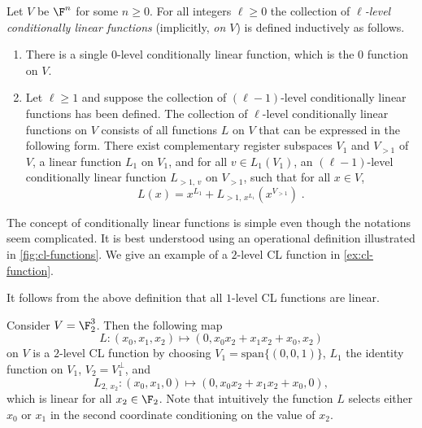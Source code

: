\begin{definition}
  \label{def:cl-func}
	Let $V$ be $\F^n$ for some $n\geq 0$.
  For all integers $\ell\geq 0$ the collection of \emph{$\ell$-level
    conditionally linear functions} (implicitly, \emph{on $V$}) is defined
  inductively as follows.
  \begin{enumerate}
  \item There is a single $0$-level conditionally linear function, which is the
    $0$ function on $V$.

  \item Let $\ell \geq 1$ and suppose the collection of $(\ell-1)$-level
    conditionally linear functions has been defined.
    The collection of $\ell$-level conditionally linear functions on $V$ consists
    of all functions $L$ on $V$ that can be expressed in the following form.
    There exist complementary register subspaces $V_1$ and $V_{>1}$ of $V$, a
    linear function $L_1$ on $V_1$, and for all $v \in L_1(V_1)$, an
    $(\ell-1)$-level conditionally linear function $L_{>1,\, v}$ on $V_{>1}$,
    such that for all $x\in V$,
    \begin{equation*}
      L(x) = x^{L_1} + L_{>1,\, x^{L_1}} (x^{V_{>1}})\;.
    \end{equation*}
  \end{enumerate}
\end{definition}

The concept of conditionally linear functions is simple even though the
notations seem complicated.
It is best understood using an operational definition illustrated in
\cref{fig:cl-functions}.
We give an example of a $2$-level CL function in \cref{ex:cl-function}.

\begin{remark}
  \label{rk:level-1-is-linear}
  It follows from the above definition that all $1$-level CL functions are linear.
\end{remark}

\begin{example}\label{ex:cl-function}
Consider $V = \F_{2}^{3}$. Then the following map
\begin{equation*}
  L:(x_{0}, x_{1}, x_{2})
  \mapsto (0, x_{0}x_{2} + x_{1}x_{2} + x_{0},  x_{2})
\end{equation*}
on $V$ is a $2$-level CL function by choosing $V_{1} = \mathrm{span}\{(0,0,1)\}$, $L_{1}$
the identity function on $V_{1}$, $V_{2} = V_{1}^{\perp}$, and
\begin{equation*}
  L_{2,\, x_{2}}: (x_{0}, x_{1}, 0)
  \mapsto (0, x_{0}x_{2} + x_{1}x_{2} + x_{0}, 0),
\end{equation*}
which is linear for all $x_{2} \in \F_{2}$.
Note that intuitively the function $L$ selects either $x_{0}$ or $x_{1}$ in the
second coordinate conditioning on the value of $x_{2}$.
\end{example}

